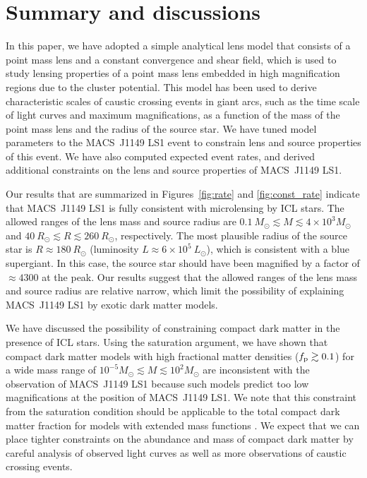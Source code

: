 \documentclass[showpacs,twocolumn,preprintnumbers,amsmath,amssymb,superscriptaddress,nofootinbib]{revtex4}
\begin{document}
\section{Summary and discussions}
\label{sec:summary}

In this paper, we have adopted a simple analytical lens model that
consists of a point mass lens and a constant convergence and shear
field, which is used to study lensing properties of a point mass lens
embedded in high magnification regions due to the cluster potential.
This model has been used to derive characteristic scales of caustic
crossing events in giant arcs, such as the time scale of light curves
and  maximum magnifications, as a function of the mass of the point
mass lens and the radius of the source star. We have tuned model
parameters to the MACS~J1149 LS1 event to constrain lens and source
properties of this event. We have also computed expected event rates,
and derived additional constraints on the lens and source properties
of  MACS~J1149 LS1.

Our results that are summarized in Figures~\ref{fig:rate} and 
\ref{fig:const_rate} indicate that MACS~J1149 LS1 is fully consistent
with microlensing by ICL stars. The allowed ranges of the lens mass
and source radius are $0.1~M_\odot \lesssim M \lesssim 4\times 10^3M_\odot$
and $40~R_\odot \lesssim R \lesssim 260~R_\odot$, 
respectively. The most plausible radius of the
source star is $R\approx 180~R_\odot$ (luminosity $L\approx
6\times 10^5~L_\odot$), which is consistent with a blue supergiant. 
In this case, the source star should have been magnified by a factor
of $\approx 4300$ at the peak. Our results suggest that the allowed
ranges of the lens mass and source radius are relative narrow, which
limit the possibility of explaining MACS~J1149 LS1 by exotic
dark matter models.

We have discussed the possibility of constraining compact dark matter
in the presence of ICL stars. Using the saturation argument, we have shown
that compact dark matter models with high fractional matter densities
($f_{\rm p}\gtrsim 0.1$) for a wide mass range of $10^{-5}M_\odot
\lesssim M\lesssim 10^2M_\odot$ are inconsistent with the observation
of MACS~J1149 LS1 because such models predict too low magnifications
at the position of MACS~J1149 LS1. We note that this constraint from
the saturation condition should be applicable to the total
compact dark matter fraction for models with extended mass functions
\cite{Carr:2017jsz}. We expect that we can place tighter
constraints on the abundance and mass of compact dark matter by
careful analysis of observed light curves as well as more observations
of caustic crossing events.
\end{document}
